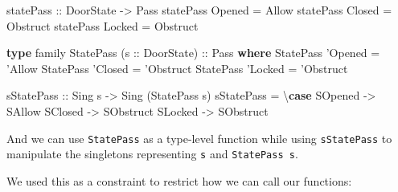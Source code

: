 \documentclass[]{article}
\newenvironment{Shaded}{}{}
\newcommand{\CommentTok}[1]{\textcolor[rgb]{0.38,0.63,0.69}{\textit{#1}}}
\newcommand{\DataTypeTok}[1]{\textcolor[rgb]{0.56,0.13,0.00}{#1}}
\newcommand{\FunctionTok}[1]{\textcolor[rgb]{0.02,0.16,0.49}{#1}}
\newcommand{\KeywordTok}[1]{\textcolor[rgb]{0.00,0.44,0.13}{\textbf{#1}}}
\newcommand{\NormalTok}[1]{#1}
\newcommand{\OtherTok}[1]{\textcolor[rgb]{0.00,0.44,0.13}{#1}}
\newcommand{\StringTok}[1]{\textcolor[rgb]{0.25,0.44,0.63}{#1}}
\begin{document}
\begin{Shaded}
\begin{Highlighting}[]
\OtherTok{statePass ::} \DataTypeTok{DoorState} \OtherTok{->} \DataTypeTok{Pass}
\NormalTok{statePass }\DataTypeTok{Opened} \FunctionTok{=} \DataTypeTok{Allow}
\NormalTok{statePass }\DataTypeTok{Closed} \FunctionTok{=} \DataTypeTok{Obstruct}
\NormalTok{statePass }\DataTypeTok{Locked} \FunctionTok{=} \DataTypeTok{Obstruct}

\KeywordTok{type}\NormalTok{ family }\DataTypeTok{StatePass}\NormalTok{ (}\OtherTok{s ::} \DataTypeTok{DoorState}\NormalTok{)}\OtherTok{ ::} \DataTypeTok{Pass} \KeywordTok{where}
    \DataTypeTok{StatePass}\NormalTok{ '}\DataTypeTok{Opened} \FunctionTok{=}\NormalTok{ '}\DataTypeTok{Allow}
    \DataTypeTok{StatePass}\NormalTok{ '}\DataTypeTok{Closed} \FunctionTok{=}\NormalTok{ '}\DataTypeTok{Obstruct}
    \DataTypeTok{StatePass}\NormalTok{ '}\DataTypeTok{Locked} \FunctionTok{=}\NormalTok{ '}\DataTypeTok{Obstruct}

\OtherTok{sStatePass ::} \DataTypeTok{Sing}\NormalTok{ s }\OtherTok{->} \DataTypeTok{Sing}\NormalTok{ (}\DataTypeTok{StatePass}\NormalTok{ s)}
\NormalTok{sStatePass }\FunctionTok{=}\NormalTok{ \textbackslash{}}\KeywordTok{case}
    \DataTypeTok{SOpened} \OtherTok{->} \DataTypeTok{SAllow}
    \DataTypeTok{SClosed} \OtherTok{->} \DataTypeTok{SObstruct}
    \DataTypeTok{SLocked} \OtherTok{->} \DataTypeTok{SObstruct}
\end{Highlighting}
\end{Shaded}

And we can use \texttt{StatePass} as a type-level function while using
\texttt{sStatePass} to manipulate the singletons representing \texttt{s} and
\texttt{StatePass\ s}.

We used this as a constraint to restrict how we can call our functions:

\begin{Shaded}
\end{Shaded}
\end{document}
